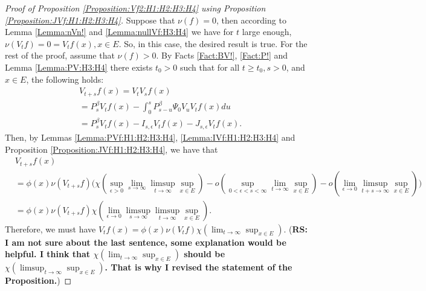 \documentclass[12pt,a4paper]{amsart}
\numberwithin{equation}{section}
\theoremstyle{plain}
\theoremstyle{definition}
\theoremstyle{remark}
\begin{document}
\begin{proof}[{Proof of Proposition \ref{Proposition:Vf2:H1:H2:H3:H4} using Proposition \ref{Proposition:JVf:H1:H2:H3:H4}}]
Suppose that $\nu(f) = 0$, then according to Lemma \ref{Lemma:nVn!} and \ref{Lemma:nullVf:H3:H4} we have for $t$ large enough, $\nu(V_tf) =0= V_tf(x), x\in E$.
So, in this case, the desired result is true.
For the rest of the proof, assume that $\nu(f)>0$.
By Facts \ref{Fact:BV!}, \ref{Fact:P!} and Lemma \ref{Lemma:PV:H3:H4} there exists $t_0> 0$ such that for all $t\geq t_0, s> 0$, and $x\in E$, the following holds:
\begin{align}
 &V_{t+s}f (x)
 = V_t V_s f(x)
 \\&= P_s^\beta V_t f(x) - \int_0^s P^\beta_{s-u}\Psi_0 V_uV_t f(x) du
 \\&= P_s^\beta V_t f(x) - I_{s,\epsilon} V_tf(x) - J_{s,\epsilon} V_t f(x).
 \end{align}
Then, by Lemmas \ref{Lemma:PVf:H1:H2:H3:H4}, \ref{Lemma:IVf:H1:H2:H3:H4} and Proposition \ref{Proposition:JVf:H1:H2:H3:H4}, we have that
\begin{align}
 &V_{t+s}f (x)
 \\&= \phi(x)\nu(V_{t+s}f) \Big( \chi(\sup_{\epsilon > 0}\lim_{s\to \infty} \limsup_{t\to \infty} \sup_{x\in E}) - o(\sup_{0<\epsilon < s<\infty} \lim_{t\to \infty}\sup_{x\in E}) - o(\lim_{\epsilon \to 0} \limsup_{t+s\to \infty} \sup_{x\in E})\Big)
 \\&= \phi(x) \nu(V_{t+s}f) \chi(\lim_{\epsilon\to 0} \limsup_{s\to \infty} \limsup_{t\to \infty} \sup_{x\in E}).
 \end{align}
Therefore, we must have $V_{t}f (x) = \phi(x) \nu (V_{t}f) \chi(\lim_{t\to \infty} \sup_{x\in E})$. ({\bf RS: I am not sure about the last sentence, some explanation would be helpful. I think that 
$\chi(\lim_{t\to \infty} \sup_{x\in E})$ should be $\chi(\limsup_{t\to \infty} \sup_{x\in E})$. That is why I revised the statement of the Proposition.})
\end{proof}
\end{document}
